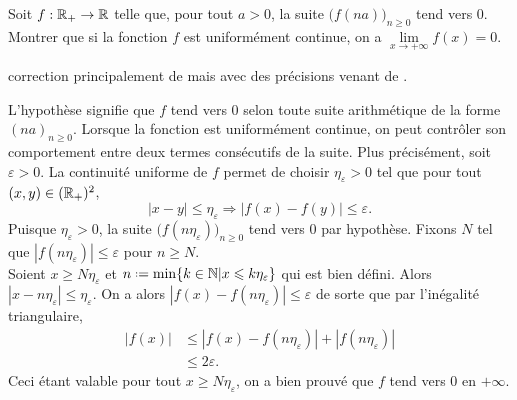 
\begin{lemme}
    Soit $f : \mathbb{R}_+ \to \mathbb{R}$ telle que, pour tout $a > 0$, la suite $\big(f(na) \big)_{n \geqslant 0}$ tend vers 0. \\
    Montrer que si la fonction $f$ est uniformément continue, on a $\lim\limits_{x \to + \infty} f(x) = 0$.
\end{lemme}

correction principalement de \cite{oraux_x_ens_3} mais avec des précisions venant de \cite{exos_oraux}.

\begin{preuve}
    L'hypothèse signifie que $f$ tend vers $0$ selon toute suite arithmétique de la forme $(na)_{n \geqslant 0}$. Lorsque la fonction est uniformément continue, on peut contrôler son comportement entre deux termes consécutifs de la suite. Plus précisément, soit $\varepsilon > 0$. La continuité uniforme de $f$ permet de choisir $\eta_\varepsilon > 0$ tel que pour tout $(x, y) \in (\mathbb{R}_+)^2$, 
    $$|x-y| \leqslant \eta_\varepsilon \Rightarrow |f(x) - f(y)| \leqslant \varepsilon.$$
    Puisque $\eta_\varepsilon > 0$, la suite $\big(f(n\eta_\varepsilon)\big)_{n \geqslant 0}$ tend vers $0$ par hypothèse. Fixons $N$ tel que $|f(n \eta_\varepsilon)| \leqslant \varepsilon$ pour $n \geqslant N$. \\
    Soient $x \geqslant N \eta_\varepsilon$ et $n \defeq \min\{ k \in \N | x \leqslant k \eta_\varepsilon \}$ qui est bien défini. Alors $|x-n\eta_\varepsilon| \leqslant \eta_\varepsilon$. On a alors $|f(x) - f(n \eta_\varepsilon)| \leqslant \varepsilon$ de sorte que par l'inégalité triangulaire, 
    \begin{align*}
        |f(x)| &\leqslant |f(x) - f(n \eta_\varepsilon)| + |f(n \eta_\varepsilon)| \\
        &\leqslant 2 \varepsilon.
    \end{align*}
    Ceci étant valable pour tout $x \geqslant N \eta_\varepsilon$, on a bien prouvé que $f$ tend vers $0$ en $+ \infty$.
\end{preuve}  

\begin{marginfigure}[-3cm]
    
\end{marginfigure}
